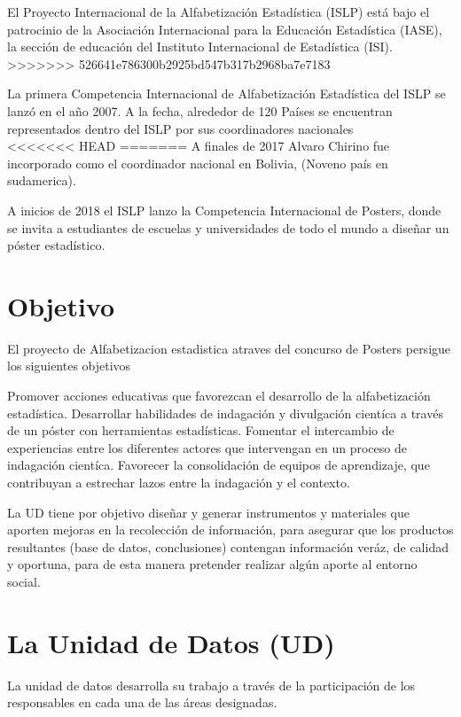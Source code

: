 \documentclass{article}
\begin{document}
El Proyecto Internacional de la Alfabetización Estadística (ISLP) está bajo el patrocinio de la Asociación Internacional para la Educación Estadística (IASE), la sección de educación del Instituto Internacional de Estadística (ISI).\\
>>>>>>> 526641e786300b2925bd547b317b2968ba7e7183

La primera Competencia Internacional de Alfabetización Estadística del ISLP se lanzó en el año 2007. A la fecha, alrededor de 120 Países se encuentran representados dentro del ISLP por sus coordinadores nacionales\\

<<<<<<< HEAD
=======
A finales de 2017 Alvaro Chirino fue incorporado como el coordinador nacional en Bolivia, (Noveno país en sudamerica).

A inicios de 2018 el ISLP lanzo la Competencia Internacional de
Posters, donde se invita a estudiantes de escuelas y universidades de todo el mundo a diseñar un póster estadístico.

\section{Objetivo}
El proyecto de Alfabetizacion estadistica atraves del concurso de Posters persigue los siguientes objetivos 

Promover acciones educativas que favorezcan el desarrollo de la
alfabetización estadística.
Desarrollar habilidades de indagación y divulgación cientíca a través de un póster con herramientas estadísticas.
Fomentar el intercambio de experiencias entre los diferentes actores que intervengan en un proceso de indagación cientíca.
Favorecer la consolidación de equipos de aprendizaje, que contribuyan a estrechar lazos entre la indagación y el contexto.




La UD tiene por objetivo diseñar y generar instrumentos y materiales que aporten mejoras en la recolección de información, para asegurar que los productos resultantes (base de datos, conclusiones) contengan información veráz, de calidad y oportuna, para de esta manera pretender realizar algún aporte al entorno social.
\section{La Unidad de Datos (UD)}


La unidad de datos desarrolla su trabajo a través de la participación de los responsables en cada una de las áreas designadas.\\
\end{document}
